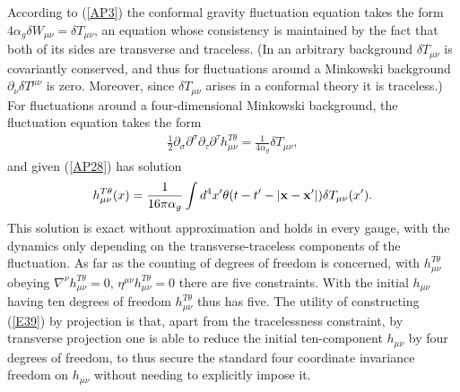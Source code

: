 \documentclass[aps]{revtex4}
\begin{document}
According to (\ref{AP3}) the conformal gravity fluctuation equation takes the form $4\alpha_g\delta W_{\mu\nu}=\delta T_{\mu\nu}$, an equation whose consistency is maintained by the fact that both of its sides are transverse and traceless. (In an arbitrary background  $\delta T_{\mu\nu}$ is covariantly conserved, and thus for fluctuations around a Minkowski background $\partial_{\nu}\delta T^{\mu\nu}$ is zero. Moreover, since $\delta T_{\mu\nu}$ arises in a conformal theory it is traceless.) For fluctuations around a four-dimensional Minkowski background, the fluctuation equation takes the form 
%
\begin{eqnarray}
\frac{1}{2}\partial_{\sigma}\partial^{\sigma}\partial_{\tau}\partial^{\tau}h_{\mu\nu}^{T\theta}=\frac{1}{4\alpha_g}\delta T_{\mu\nu},
\label{E39}
\end{eqnarray}
%
and given (\ref{AP28}) has solution 
%
\begin{eqnarray}
h_{\mu\nu}^{T\theta}(x)=\frac{1}{16\pi\alpha_g}\int d^4x^{\prime}\theta(t-t^{\prime}-|{\bf x}-{\bf x}^{\prime}|)
\delta T_{\mu\nu}(x^{\prime}).
\label{E40}
\end{eqnarray}
%
This solution is exact without approximation and holds in every gauge, with the dynamics only depending on the transverse-traceless components of the fluctuation. As far as the counting of degrees of freedom is concerned, with $h_{\mu\nu}^{T\theta}$ obeying $\nabla^{\nu}h_{\mu\nu}^{T\theta}=0$, $\eta^{\mu\nu}h_{\mu\nu}^{T\theta}=0$ there are five constraints. With the initial $h_{\mu\nu}$ having ten degrees of freedom $h_{\mu\nu}^{T\theta}$ thus has five. The utility of constructing (\ref{E39}) by projection is that, apart from the tracelessness constraint, by transverse projection one is able to reduce the initial ten-component $h_{\mu\nu}$ by four degrees of freedom, to thus secure the standard four coordinate invariance freedom on $h_{\mu\nu}$ without needing to explicitly impose it.
\end{document}
